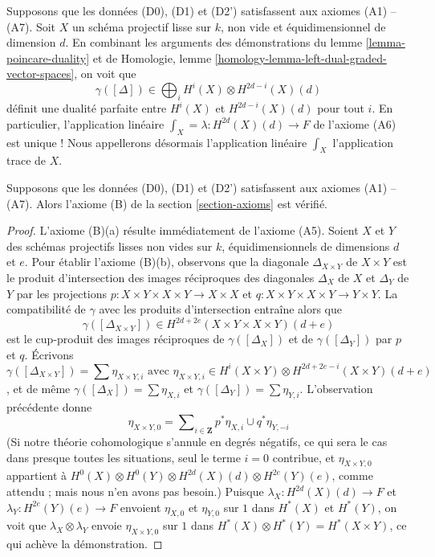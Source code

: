 \begin{remark}
\label{remark-trace}
Supposons que les données (D0), (D1) et (D2') satisfassent aux axiomes (A1) -- (A7).
Soit $X$ un schéma projectif lisse sur $k$, non vide
et équidimensionnel de dimension $d$. En combinant les arguments
des démonstrations du lemme \ref{lemma-poincare-duality} et de
Homologie, lemme \ref{homology-lemma-left-dual-graded-vector-spaces},
on voit que
$$
\gamma([\Delta]) \in \bigoplus\nolimits_i H^i(X) \otimes H^{2d - i}(X)(d)
$$
définit une dualité parfaite entre $H^i(X)$ et $H^{2d - i}(X)(d)$
pour tout $i$.
En particulier, l'application linéaire $\int_X = \lambda : H^{2d}(X)(d) \to F$ de
l'axiome (A6) est unique ! Nous appellerons désormais l'application linéaire $\int_X$
l'application trace de $X$.
\end{remark}

\begin{lemma}
\label{lemma-trace-product}
Supposons que les données (D0), (D1) et (D2') satisfassent aux axiomes (A1) -- (A7).
Alors l'axiome (B) de la section \ref{section-axioms} est vérifié.
\end{lemma}

\begin{proof}
L'axiome (B)(a) résulte immédiatement de l'axiome (A5).
Soient $X$ et $Y$ des schémas projectifs lisses non vides sur $k$,
équidimensionnels de dimensions $d$ et $e$. Pour établir l'axiome (B)(b),
observons que la diagonale $\Delta_{X \times Y}$ de $X \times Y$
est le produit d'intersection des images réciproques des diagonales
$\Delta_X$ de $X$ et $\Delta_Y$ de $Y$ par les projections
$p : X \times Y \times X \times Y \to X \times X$ et
$q : X \times Y \times X \times Y \to Y \times Y$.
La compatibilité de $\gamma$ avec les produits d'intersection entraîne alors
que
$$
\gamma([\Delta_{X \times Y}]) \in
H^{2d + 2e}(X \times Y \times X \times Y)(d + e)
$$
est le cup-produit des images réciproques de $\gamma([\Delta_X])$
et de $\gamma([\Delta_Y])$ par $p$ et $q$. Écrivons
$$
\gamma([\Delta_{X \times Y}]) = \sum \eta_{X \times Y, i}
\text{ avec }
\eta_{X \times Y, i} \in
H^i(X \times Y) \otimes H^{2d + 2e - i}(X \times Y)(d + e)
$$,
et de même $\gamma([\Delta_X]) = \sum \eta_{X, i}$ et
$\gamma([\Delta_Y]) = \sum \eta_{Y, i}$. L'observation précédente
donne
$$
\eta_{X \times Y, 0} =
\sum\nolimits_{i \in \mathbf{Z}} p^*\eta_{X, i} \cup q^*\eta_{Y, -i}
$$
(Si notre théorie cohomologique s'annule en degrés négatifs, ce qui sera
le cas dans presque toutes les situations, seul le terme $i = 0$ contribue,
et $\eta_{X \times Y, 0}$ appartient à
$H^0(X) \otimes H^0(Y) \otimes H^{2d}(X)(d) \otimes H^{2e}(Y)(e)$, comme attendu ;
mais nous n'en avons pas besoin.) Puisque $\lambda_X : H^{2d}(X)(d) \to F$ et
$\lambda_Y : H^{2e}(Y)(e) \to F$ envoient $\eta_{X, 0}$ et $\eta_{Y, 0}$
sur $1$ dans $H^*(X)$ et $H^*(Y)$, on voit que $\lambda_X \otimes \lambda_Y$
envoie $\eta_{X \times Y, 0}$ sur $1$ dans
$H^*(X) \otimes H^*(Y) = H^*(X \times Y)$, ce qui achève la démonstration.
\end{proof}

